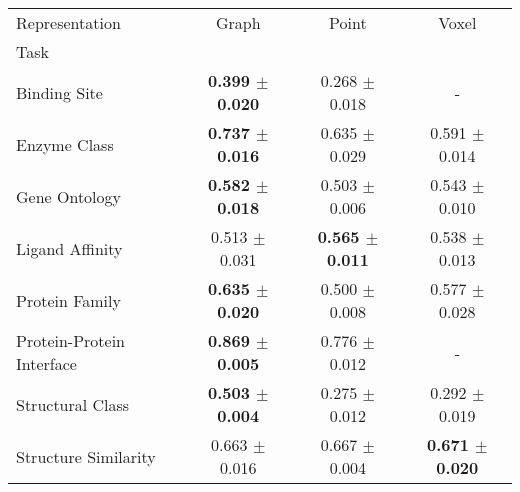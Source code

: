 \begin{tabular}{lccc}
\toprule
Representation & Graph & Point & Voxel \\
Task &  &  &  \\
\midrule
Binding Site & \textbf{0.399 $\pm$ 0.020} & 0.268 $\pm$ 0.018 & - \\
Enzyme Class & \textbf{0.737 $\pm$ 0.016} & 0.635 $\pm$ 0.029 & 0.591 $\pm$ 0.014 \\
Gene Ontology & \textbf{0.582 $\pm$ 0.018} & 0.503 $\pm$ 0.006 & 0.543 $\pm$ 0.010 \\
Ligand Affinity & 0.513 $\pm$ 0.031 & \textbf{0.565 $\pm$ 0.011} & 0.538 $\pm$ 0.013 \\
Protein Family & \textbf{0.635 $\pm$ 0.020} & 0.500 $\pm$ 0.008 & 0.577 $\pm$ 0.028 \\
Protein-Protein Interface & \textbf{0.869 $\pm$ 0.005} & 0.776 $\pm$ 0.012 & - \\
Structural Class & \textbf{0.503 $\pm$ 0.004} & 0.275 $\pm$ 0.012 & 0.292 $\pm$ 0.019 \\
Structure Similarity & 0.663 $\pm$ 0.016 & 0.667 $\pm$ 0.004 & \textbf{0.671 $\pm$ 0.020} \\
\bottomrule
\end{tabular}
